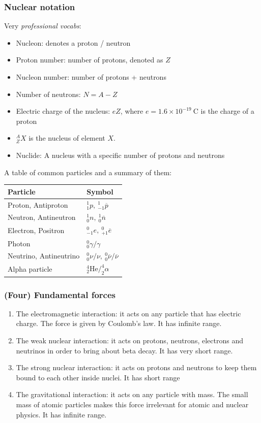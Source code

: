 \subsubsection*{Nuclear notation}
Very \textit{professional vocabs}:
\begin{itemize}
  \item Nucleon: denotes a proton / neutron
  \item Proton number: number of protons, denoted as $Z$
  \item Nucleon number: number of protons + neutrons
  \item Number of neutrons: $N=A-Z$
  \item Electric charge of the nucleus: $eZ$, where $e=1.6\times 10^{-19}\ \text{C}$ is the charge of a proton
  \item $^A_ZX$ is the nucleus of element $X$.
  \item Nuclide: A nucleus with a specific number of protons and neutrons
\end{itemize}
A table of common particles and a summary of them:
\begin{center}
\begin{tabularx}{\textwidth}{@{}|Y | Y|@{}}
\toprule
\textbf{Particle} & \textbf{Symbol} \\
\midrule 
Proton, Antiproton & $^1_1p,\ ^1_{-1}\overline{p}$\\
\midrule
Neutron, Antineutron & $^1_0n,\ ^1_0\overline{n}$\\
\midrule
Electron, Positron & $^0_{-1}e,\ ^0_{+1}\overline{e}$\\
\midrule
Photon & $^0_0\gamma/\gamma$ \\
\midrule
Neutrino, Antineutrino & $^0_0\nu/\nu,\ ^0_0\overline{\nu}/\overline{\nu}$ \\
\midrule
Alpha particle & $^4_2\text{He}/^4_2\alpha$ \\
\bottomrule 
\end{tabularx}
\end{center}
\subsubsection*{(Four) Fundamental forces}
\begin{enumerate}
  \item The electromagnetic interaction: it acts on any particle that has electric charge. The force is given by Coulomb's law. It has infinite range.
  \item The weak nuclear interaction: it acts on protons, neutrons, electrons and neutrinos in order to bring about beta decay. It has very short range.
  \item The strong nuclear interaction: it acts on protons and neutrons to keep them bound to each other inside nuclei. It has short range
  \item The gravitational interaction: it acts on any particle with mass. The small mass of atomic particles makes this force irrelevant for atomic and nuclear physics. It has infinite range.
\end{enumerate}
